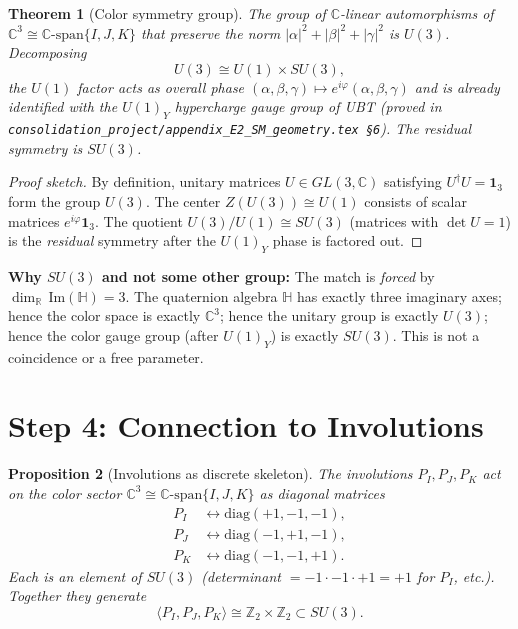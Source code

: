 \documentclass[12pt,a4paper]{article}
\newtheorem{theorem}{Theorem}[section]
\newtheorem{proposition}[theorem]{Proposition}
\theoremstyle{definition}
\theoremstyle{remark}
\begin{document}
\begin{theorem}[Color symmetry group]
\label{thm:color_symmetry}
The group of $\mathbb{C}$-linear automorphisms of
$\mathbb{C}^3 \cong \mathbb{C}\text{-span}\{I,J,K\}$ that preserve the norm
$|\alpha|^2 + |\beta|^2 + |\gamma|^2$ is $U(3)$.  Decomposing
\[
  U(3) \cong U(1) \times SU(3),
\]
the $U(1)$ factor acts as overall phase $(\alpha,\beta,\gamma) \mapsto
e^{i\varphi}(\alpha,\beta,\gamma)$ and is already identified with the $U(1)_Y$
hypercharge gauge group of UBT (proved in
\texttt{consolidation\_project/appendix\_E2\_SM\_geometry.tex~\S6}).
The residual symmetry is $SU(3)$.
\end{theorem}

\begin{proof}[Proof sketch]
By definition, unitary matrices $U \in GL(3,\mathbb{C})$ satisfying
$U^\dagger U = \mathbf{1}_3$ form the group $U(3)$.
The center $Z(U(3)) \cong U(1)$ consists of scalar matrices $e^{i\varphi}
\mathbf{1}_3$.  The quotient $U(3)/U(1) \cong SU(3)$ (matrices with
$\det U = 1$) is the \emph{residual} symmetry after the $U(1)_Y$ phase is
factored out.
\end{proof}

\begin{insightbox}
\textbf{Why $SU(3)$ and not some other group:}
The match is \emph{forced} by $\dim_\mathbb{R}\,\mathrm{Im}(\mathbb{H}) = 3$.
The quaternion algebra $\mathbb{H}$ has exactly three imaginary axes; hence
the color space is exactly $\mathbb{C}^3$; hence the unitary group is exactly
$U(3)$; hence the color gauge group (after $U(1)_Y$) is exactly $SU(3)$.
This is not a coincidence or a free parameter.
\end{insightbox}

\section{Step 4: Connection to Involutions}
\label{sec:involutions}

\begin{proposition}[Involutions as discrete skeleton]
\label{prop:involutions_skeleton}
The involutions $P_I, P_J, P_K$ act on the color sector
$\mathbb{C}^3 \cong \mathbb{C}\text{-span}\{I,J,K\}$ as diagonal matrices
\begin{align*}
  P_I &\leftrightarrow \mathrm{diag}(+1, -1, -1), \\
  P_J &\leftrightarrow \mathrm{diag}(-1, +1, -1), \\
  P_K &\leftrightarrow \mathrm{diag}(-1, -1, +1).
\end{align*}
Each is an element of $SU(3)$ (determinant $= -1 \cdot -1 \cdot +1 = +1$ for
$P_I$, etc.).  Together they generate
\[
  \langle P_I, P_J, P_K \rangle \cong \mathbb{Z}_2 \times \mathbb{Z}_2
  \subset SU(3).
\]
\end{proposition}
\end{document}
